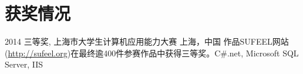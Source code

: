 \documentclass[]{friggeri-cv-cn} %
\begin{document}

%


\section{获奖情况}

\begin{entrylist}
\entry
{2014}
{三等奖, 上海市大学生计算机应用能力大赛}
{上海，中国}
{作品SUFEEL网站(\url{http://sufeel.org})在最终逾400件参赛作品中获得三等奖。{\color{lightgray}\footnotesize C\#.net, Microsoft SQL Server, IIS}}
\end{entrylist}

\end{document}
